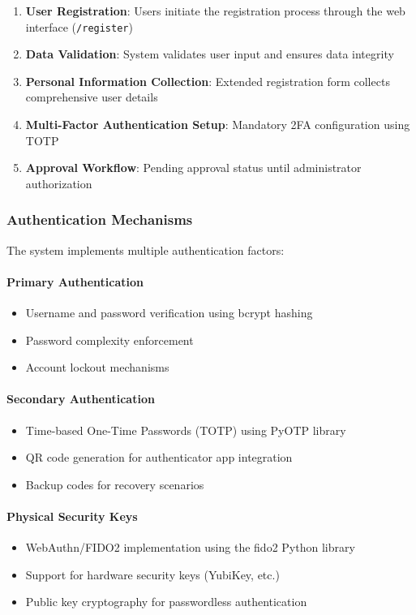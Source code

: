 \documentclass[12pt,a4paper]{article}
\begin{document}
\begin{enumerate}
    \item \textbf{User Registration}: Users initiate the registration process through the web interface (\texttt{/register})
    \item \textbf{Data Validation}: System validates user input and ensures data integrity
    \item \textbf{Personal Information Collection}: Extended registration form collects comprehensive user details
    \item \textbf{Multi-Factor Authentication Setup}: Mandatory 2FA configuration using TOTP
    \item \textbf{Approval Workflow}: Pending approval status until administrator authorization
\end{enumerate}



\subsubsection{Authentication Mechanisms}
The system implements multiple authentication factors:

\paragraph{Primary Authentication}
\begin{itemize}
    \item Username and password verification using bcrypt hashing
    \item Password complexity enforcement
    \item Account lockout mechanisms
\end{itemize}

\paragraph{Secondary Authentication}
\begin{itemize}
    \item Time-based One-Time Passwords (TOTP) using PyOTP library
    \item QR code generation for authenticator app integration
    \item Backup codes for recovery scenarios
\end{itemize}

\paragraph{Physical Security Keys}
\begin{itemize}
    \item WebAuthn/FIDO2 implementation using the fido2 Python library
    \item Support for hardware security keys (YubiKey, etc.)
    \item Public key cryptography for passwordless authentication
\end{itemize}
\end{document}
